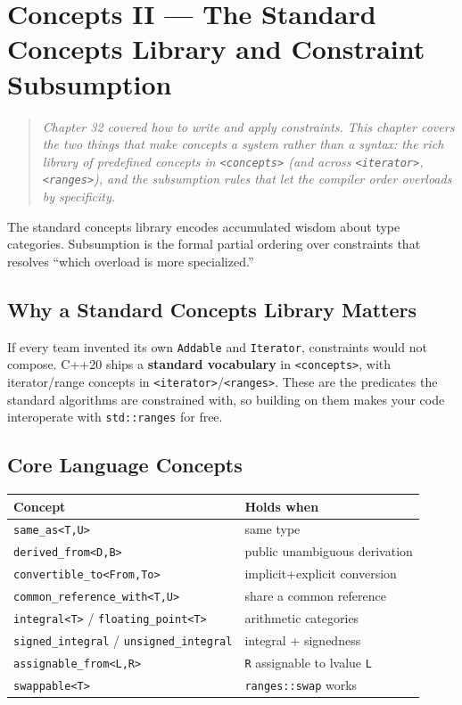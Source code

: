 \chapter{Concepts II --- The Standard Concepts Library and Constraint Subsumption}
\label{ch:c20-concepts-ii}

\begin{quote}
\emph{Chapter 32 covered how to write and apply constraints. This chapter covers the two things that make concepts a system rather than a syntax: the rich library of predefined concepts in \texttt{<concepts>} (and across \texttt{<iterator>}, \texttt{<ranges>}), and the subsumption rules that let the compiler order overloads by specificity.}
\end{quote}

The standard concepts library encodes accumulated wisdom about type categories. Subsumption is the formal partial ordering over constraints that resolves ``which overload is more specialized.''

\section{Why a Standard Concepts Library Matters}
\label{sec:c20-std-concepts-why}

If every team invented its own \texttt{Addable} and \texttt{Iterator}, constraints would not compose. C++20 ships a \textbf{standard vocabulary} in \texttt{<concepts>}, with iterator/range concepts in \texttt{<iterator>}/\texttt{<ranges>}. These are the predicates the standard algorithms are constrained with, so building on them makes your code interoperate with \texttt{std::ranges} for free.

\section{Core Language Concepts}
\label{sec:c20-core-concepts}

\begin{center}
\begin{tabular}{ll}
\hline
\textbf{Concept} & \textbf{Holds when} \\
\hline
\texttt{same\_as<T,U>} & same type \\
\texttt{derived\_from<D,B>} & public unambiguous derivation \\
\texttt{convertible\_to<From,To>} & implicit+explicit conversion \\
\texttt{common\_reference\_with<T,U>} & share a common reference \\
\texttt{integral<T>} / \texttt{floating\_point<T>} & arithmetic categories \\
\texttt{signed\_integral} / \texttt{unsigned\_integral} & integral + signedness \\
\texttt{assignable\_from<L,R>} & \texttt{R} assignable to lvalue \texttt{L} \\
\texttt{swappable<T>} & \texttt{ranges::swap} works \\
\hline
\end{tabular}
\end{center}

